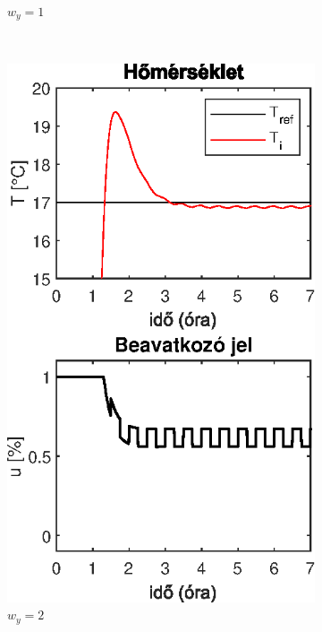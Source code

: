 \begin{figure}[H]
\begin{subfigure}[t]{0.32\textwidth}
		\caption{$w_y=1$}
		\label{fig:mpc-wy-1}
	\end{subfigure}
	~
	\begin{subfigure}[t]{0.32\textwidth}
		\centering
		\includegraphics[width=\textwidth]{figures/realsys/mpc-wy-2}
		\caption{$w_y=2$}
		\label{fig:mpc-wy-2}
	\end{subfigure}
	~
	\begin{subfigure}[t]{0.32\textwidth}
		\centering

\end{subfigure}
\end{figure}
